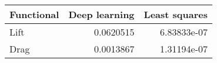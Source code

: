 \begin{tabular}{lrr}
\toprule
 Functional   &   Deep learning &   Least squares \\
\midrule
 Lift         &       0.0620515 &     6.83833e-07 \\
 Drag         &       0.0013867 &     1.31194e-07 \\
\bottomrule
\end{tabular}
